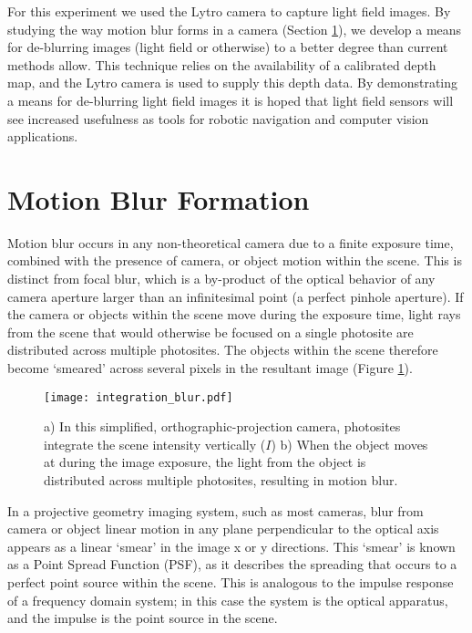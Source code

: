 For this experiment we used the Lytro camera to capture light field images.
By studying the way motion blur forms in a camera (Section \ref{sec:motion_blur_formation}), we develop a means for de-blurring images (light field or otherwise) to a better degree than current methods allow.
This technique relies on the availability of a calibrated depth map, and the Lytro camera is used to supply this depth data.
By demonstrating a means for de-blurring light field images it is hoped that light field sensors will see increased usefulness as tools for robotic navigation and computer vision applications.

\section{Motion Blur Formation}
\label{sec:motion_blur_formation}

Motion blur occurs in any non-theoretical camera due to a finite exposure time, combined with the presence of camera, or object motion within the scene.
This is distinct from focal blur, which is a by-product of the optical behavior of any camera aperture larger than an infinitesimal point (a perfect pinhole aperture).
If the camera or objects within the scene move during the exposure time, light rays from the scene that would otherwise be focused on a single photosite are distributed across multiple photosites.
The objects within the scene therefore become \enquote*{smeared} across several pixels in the resultant image (Figure \ref{fig:integration_blur}).

\begin{figure}[h]
\centering
\texttt{[image: integration\_blur.pdf]}
\caption[Motion Blur Caused by Camera Integration]{
a) In this simplified, orthographic-projection camera, photosites integrate the scene intensity vertically ($I$) b) When the object moves at during the image exposure, the light from the object is distributed across multiple photosites, resulting in motion blur.
}
\label{fig:integration_blur}
\end{figure}

In a projective geometry imaging system, such as most cameras, blur from camera or object linear motion in any plane perpendicular to the optical axis appears as a linear \enquote*{smear} in the image x or y directions.
This \enquote*{smear} is known as a Point Spread Function (PSF), as it describes the spreading that occurs to a perfect point source within the scene.
This is analogous to the impulse response of a frequency domain system; in this case the system is the optical apparatus, and the impulse is the point source in the scene.

